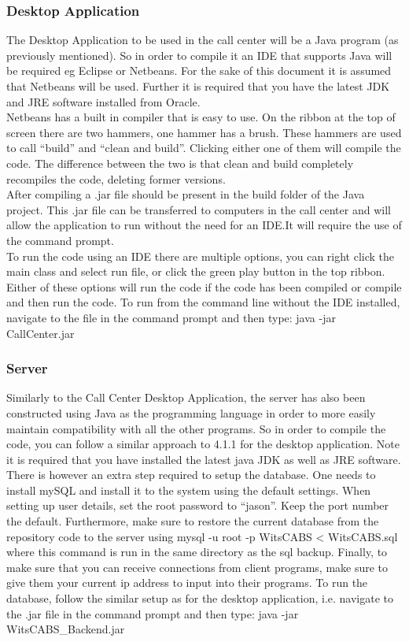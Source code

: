\documentclass[a4paper,12pt]{article}
\begin{document}
\subsubsection{Desktop Application}
The Desktop Application to be used in the call center will be a Java program (as previously mentioned). So in order to compile it an IDE that supports Java will be required eg Eclipse or Netbeans. For the sake of this document it is assumed that Netbeans will be used. Further it is required that you have the latest JDK and JRE software installed from Oracle.\\
Netbeans has a built in compiler that is easy to use. On the ribbon at the top of screen there are two hammers, one hammer has a brush. These hammers are used to call ``build'' and ``clean and build''. Clicking either one of them will compile the code. The difference between the two is that clean and build completely recompiles the code, deleting former versions.\\
After compiling a .jar file should be present in the build folder of the Java project. This .jar  file can be transferred to computers in the call center and will allow the application to run without the need for an IDE.It will require the use of the command prompt.\\To run the code using an IDE there are multiple options, you can right click the main class and select run file, or click the green play button in the top ribbon. Either of these options will run the code if the code has been compiled or compile and then run the code. To run from the command line without the IDE installed, navigate to the file in the command prompt and then type: java -jar CallCenter.jar

\subsubsection{Server}
Similarly to the Call Center Desktop Application, the server has also been constructed using Java as the programming language in order to more easily maintain compatibility with all the other programs. So in order to compile the code, you can follow a similar approach to 4.1.1 for the desktop application. Note it is required that you have installed the latest java JDK as well as JRE software. There is however an extra step required to setup the database. One needs to install mySQL and install it to the system using the default settings. When setting up user details, set the root password to ``jason''. Keep the port number the default. Furthermore, make sure to restore the current database from the repository code to the server using mysql -u root -p WitsCABS < WitsCABS.sql where this command is run in the same directory as the sql backup. Finally, to make sure that you can receive connections from client programs, make sure to give them your current ip address to input into their programs. 
To run the database, follow the similar setup as for the desktop application, i.e. navigate to the .jar file in the command prompt and then type: java -jar WitsCABS\_Backend.jar
\end{document}
